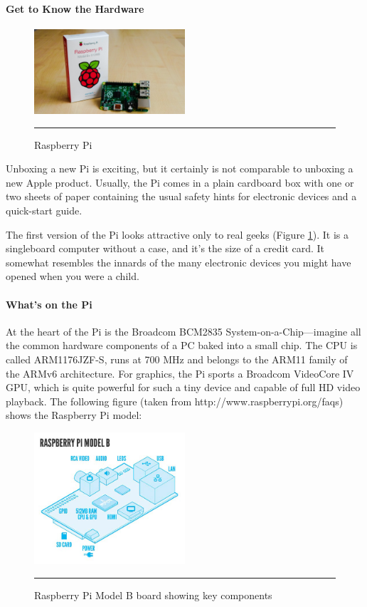 \paragraph*{Get to Know the Hardware}

\begin{figure}
\vspace{15pt}
  \begin{center}
    \includegraphics[width=0.5\textwidth]{./Pictures/unboxing_pi.jpg}
  \end{center}
  \rule{0.5\textwidth}{0.5pt}
  \caption{Raspberry Pi }
  \label{fig:unboxing_pi}
\end{figure}

\hfill \break
Unboxing a new Pi is exciting, but it certainly is not comparable to unboxing
a new Apple product. Usually, the Pi comes in a plain cardboard box with
one or two sheets of paper containing the usual safety hints for electronic
devices and a quick-start guide.

The first version of the Pi looks attractive only to real geeks (Figure \ref{fig:unboxing_pi}). It is a singleboard
computer without a case, and it’s the size of a credit card. It somewhat
resembles the innards of the many electronic devices you might have opened
when you were a child.

\paragraph*{What’s on the Pi}
\hfill \break
At the heart of the Pi is the Broadcom BCM2835 System-on-a-Chip—imagine all the
common hardware components of a PC baked into a small chip. The CPU is called
ARM1176JZF-S, runs at 700 MHz and belongs to the ARM11 family of the ARMv6
architecture. For graphics, the Pi sports a Broadcom VideoCore IV GPU, which is
quite powerful for such a tiny device and capable of full HD video playback. The
following figure (taken from http://www.raspberrypi.org/faqs) shows the
Raspberry Pi model:
\begin{figure}[h!]
  \centering
    \includegraphics[width=0.5\textwidth]{./Pictures/raspberry_pi_b2.jpg}
  \rule{0.7\textwidth}{1pt}
 \caption{Raspberry Pi Model B board showing key components}
\end{figure}

